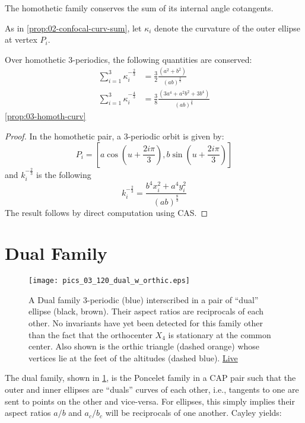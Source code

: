 \begin{corollary}
The homothetic family conserves the sum of its internal angle cotangents.
\end{corollary}

As in \cref{prop:02-confocal-curv-sum}, let $\kappa_i$ denote the curvature of the outer ellipse at vertex $P_i$.

\begin{proposition}
Over homothetic 3-periodics, the following quantities are conserved:
\begin{align*}
\sum_{i=1}^3{\kappa_i^{-\frac{2}{3}}} &=\frac{3}{2} \frac{ (a^2 + b^2)}{  (a b)^{\frac{2}{3}}} \\
\sum_{i=1}^3{\kappa_i^{-\frac{4}{3}}} &=\frac{3}{8}
\frac{(3a^4 +   a^2 b^2 + 3b^4)}{(a b)^{\frac{4}{3}} }
\end{align*}
\cref{prop:03-homoth-curv}
\end{proposition}

\begin{proof} In the homothetic pair, a 3-periodic    orbit is given by:
\[P_i=[a\cos(u + \frac{2 i \pi}{3} ), b\sin(u + \frac{2 i \pi}{3})]\]
and $k_i^{-\frac{2}{3}}$  is the following 
\[  k_i^{-\frac{2}{3}}=\frac{  b^4 x_i^2 + a^4 y_i^2 }{(a b)^{\frac{8}{3}}}\]  
The result follows by direct computation using CAS.
\end{proof}

\section{Dual Family}

\begin{figure}
    \centering
    \texttt{[image: pics\_03\_120\_dual\_w\_orthic.eps]}
    \caption{A Dual family 3-periodic (blue) interscribed in a pair of ``dual'' ellipse (black, brown). Their aspect ratios are reciprocals of each other. No invariants have yet been detected for this family other than the fact that the orthocenter $X_4$ is stationary at the common center. Also shown is the orthic triangle (dashed orange) whose vertices lie at the feet of the altitudes (dashed blue). \href{https://bit.ly/337wTBS}{Live}}
    \label{fig:03-n3-dual}
\end{figure}


The dual family, shown in \cref{fig:03-n3-dual}, is the Poncelet family in a CAP pair such that the outer and inner ellipses are ``duals'' curves of each other, i.e., tangents to one are sent to points on the other and vice-versa. For ellipses, this simply implies their aspect ratios $a/b$ and $a_c/b_c$ will be reciprocals of one another. Cayley yields:

